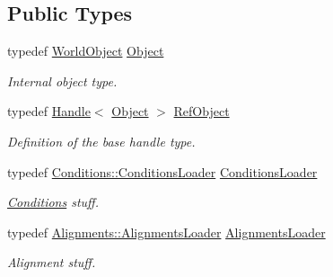 \subsection*{Public Types}
\begin{DoxyCompactItemize}
\item 
typedef \hyperlink{class_d_d4hep_1_1_geometry_1_1_world_object}{World\+Object} \hyperlink{class_d_d4hep_1_1_geometry_1_1_world_ade4542483ec578548cb266880f67e329}{Object}
\begin{DoxyCompactList}\small\item\em Internal object type. \end{DoxyCompactList}\item 
typedef \hyperlink{class_d_d4hep_1_1_handle}{Handle}$<$ \hyperlink{class_d_d4hep_1_1_geometry_1_1_world_ade4542483ec578548cb266880f67e329}{Object} $>$ \hyperlink{class_d_d4hep_1_1_geometry_1_1_world_a796916c7109e45753547adc18d85aa7f}{Ref\+Object}
\begin{DoxyCompactList}\small\item\em Definition of the base handle type. \end{DoxyCompactList}\item 
typedef \hyperlink{class_d_d4hep_1_1_conditions_1_1_conditions_loader}{Conditions\+::\+Conditions\+Loader} \hyperlink{class_d_d4hep_1_1_geometry_1_1_world_aadddae79d9d6be44141befbbb4b7337b}{Conditions\+Loader}
\begin{DoxyCompactList}\small\item\em \hyperlink{namespace_d_d4hep_1_1_conditions}{Conditions} stuff. \end{DoxyCompactList}\item 
typedef \hyperlink{class_d_d4hep_1_1_alignments_1_1_alignments_loader}{Alignments\+::\+Alignments\+Loader} \hyperlink{class_d_d4hep_1_1_geometry_1_1_world_a4756d57ac9e7f6d43056b07dfbfe6904}{Alignments\+Loader}
\begin{DoxyCompactList}\small\item\em Alignment stuff. \end{DoxyCompactList}\end{DoxyCompactItemize}
